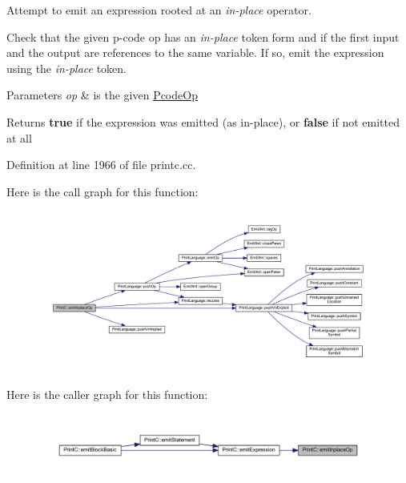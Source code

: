 Attempt to emit an expression rooted at an {\itshape in-\/place} operator. 

Check that the given p-\/code op has an {\itshape in-\/place} token form and if the first input and the output are references to the same variable. If so, emit the expression using the {\itshape in-\/place} token. 
\begin{DoxyParams}{Parameters}
{\em op} & is the given \mbox{\hyperlink{class_pcode_op}{Pcode\+Op}} \\
\hline
\end{DoxyParams}
\begin{DoxyReturn}{Returns}
{\bfseries{true}} if the expression was emitted (as in-\/place), or {\bfseries{false}} if not emitted at all 
\end{DoxyReturn}


Definition at line 1966 of file printc.\+cc.

Here is the call graph for this function\+:
\nopagebreak
\begin{figure}[H]
\begin{center}
\leavevmode
\includegraphics[width=350pt]{class_print_c_aa1189e40787980076c6827bb4e20fbef_cgraph}
\end{center}
\end{figure}
Here is the caller graph for this function\+:
\nopagebreak
\begin{figure}[H]
\begin{center}
\leavevmode
\includegraphics[width=350pt]{class_print_c_aa1189e40787980076c6827bb4e20fbef_icgraph}
\end{center}
\end{figure}
\mbox{\label{class_print_c_ac8dc5f836c6c487956b03a55a9d8241f}} 
